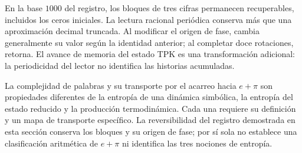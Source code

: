 En la base $1000$ del registro, los bloques de tres cifras permanecen
recuperables, incluidos los ceros iniciales. La lectura racional
periódica conserva más que una aproximación decimal truncada.
Al modificar el origen de fase, cambia generalmente su valor según
la identidad anterior; al completar doce rotaciones, retorna.
El avance de memoria del estado TPK es una transformación adicional:
la periodicidad del lector no identifica las historias acumuladas.

\begin{remark}
La complejidad de palabras y su transporte por el acarreo hacia
$e+\pi$ son propiedades diferentes de la entropía de una dinámica
simbólica, la entropía del estado reducido y la producción termodinámica.
Cada una requiere su definición y un mapa de transporte específico.
La reversibilidad del registro demostrada en esta sección conserva
los bloques y su origen de fase; por sí sola no establece una
clasificación aritmética de $e+\pi$ ni identifica las tres nociones
de entropía.
\end{remark}
